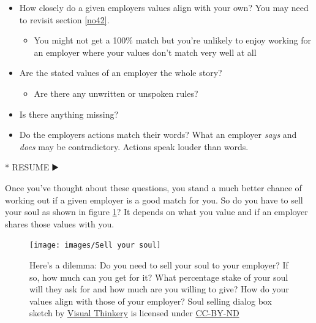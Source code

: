 \documentclass[
]{book}
\newenvironment{Shaded}{\begin{snugshade}}{\end{snugshade}}
\newcommand{\NormalTok}[1]{#1}
\newcommand{\SpecialStringTok}[1]{\textcolor[rgb]{0.31,0.60,0.02}{#1}}
\providecommand{\tightlist}{%
  \setlength{\itemsep}{0pt}\setlength{\parskip}{0pt}}
\begin{document}
\begin{itemize}
\tightlist
\item
  How closely do a given employers values align with your own? You may need to revisit section \ref{no42}.

  \begin{itemize}
  \tightlist
  \item
    You might not get a 100\% match but you're unlikely to enjoy working for an employer where your values don't match very well at all
  \end{itemize}
\item
  Are the stated values of an employer the whole story?

  \begin{itemize}
  \tightlist
  \item
    Are there any unwritten or unspoken rules?
  \end{itemize}
\item
  Is there anything missing?
\item
  Do the employers actions match their words? What an employer \emph{says} and \emph{does} may be contradictory. Actions speak louder than words.
\end{itemize}

\begin{Shaded}
\begin{Highlighting}[]
\SpecialStringTok{* }\NormalTok{RESUME ▶️}
\end{Highlighting}
\end{Shaded}

Once you've thought about these questions, you stand a much better chance of working out if a given employer is a good match for you. So do you have to sell your soul as shown in figure \ref{fig:soul-fig}? It depends on what you value and if an employer shares those values with you.

\begin{figure}

{\centering \texttt{[image: images/Sell your soul]} 

}

\caption{Here's a dilemma: Do you need to sell your soul to your employer? If so, how much can you get for it? What percentage stake of your soul will they ask for and how much are you willing to give? How do your values align with those of your employer? Soul selling dialog box sketch by \href{https://visualthinkery.com/}{Visual Thinkery} is licensed under \href{https://creativecommons.org/licenses/by-nd/4.0/}{CC-BY-ND}}\label{fig:soul-fig}
\end{figure}
\end{document}

